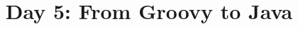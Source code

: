 \documentclass{article}
\begin{document}
\title{Day 5: From Groovy to Java}
\date{}
\maketitle



\end{document}
